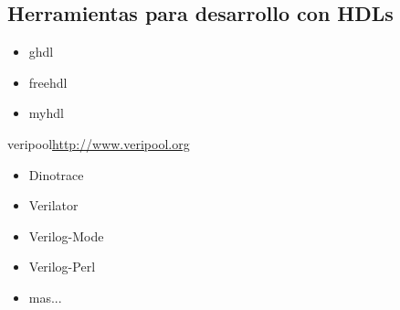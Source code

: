\documentclass{beamer}
\begin{document}
\subsection{Herramientas para desarrollo con HDLs}

\begin{frame}
  \begin{itemize}
  \item ghdl
  \item freehdl
  \item myhdl
  \end{itemize}
\end{frame}
\begin{frame}{veripool}{\url{http://www.veripool.org}}
  \begin{itemize}
  \item Dinotrace
  \item Verilator
  \item Verilog-Mode
  \item Verilog-Perl
  \item mas...
  \end{itemize}
\end{frame}


  



\end{document}
